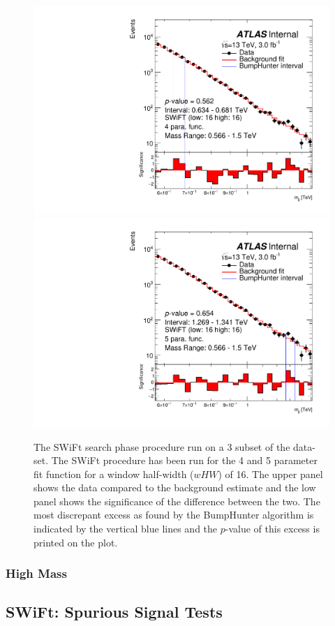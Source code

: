 \begin{figure}[!htb]
\captionsetup[subfigure]{aboveskip=0pt,justification=centering}
\centering
{} {
  \includegraphics[width=0.45\linewidth, angle=0]{figs/Dibjet/LowMass/FitStudy_min566/bhFit_subset_4para_low16_high16.pdf}
}
 {
  \includegraphics[width=0.45\linewidth, angle=0]{figs/Dibjet/LowMass/FitStudy_min566/bhFit_subset_5para_low16_high16.pdf}
}
\vspace{10pt}
\caption{\label{fig:bhFit_lm_subset}
  The SWiFt search phase procedure run on a 3 \ifb{} subset of the \lm{} data-set.
  The SWiFt procedure has been run for the 4 and 5 parameter fit function for a window half-width ($wHW$) of 16.
  The upper panel shows the data compared to the background estimate and the low panel shows the significance of the difference between the two.
  The most discrepant excess as found by the {\sc BumpHunter} algorithm is indicated by the vertical blue lines and the \mbox{$p$-value} of this excess is printed on the plot. }
\end{figure}

\subsubsection{High Mass}
\label{sec:highmass_windowSelTests} 

\subsection{SWiFt: Spurious Signal Tests}
\label{sec:spuriousSignal}

